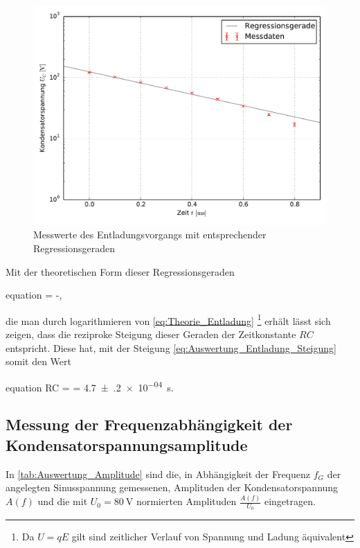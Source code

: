 	\begin{figure}[!h]
		\centering
		\includegraphics[scale=0.7]{Grafiken/Entladung.pdf}
		\caption{Messwerte des Entladungsvorgangs mit entsprechender Regressionsgeraden}
		\label{fig:Auswertung_EntladungLog}
	\end{figure}
	 
	Mit der theoretischen Form dieser Regressionsgeraden 
	\begin{empheq}{equation}
		\ln{}  = -, 
	\end{empheq}
	die man durch logarithmieren von \cref{eq:Theorie_Entladung}
	\footnote{Da $ U = qE $ gilt sind zeitlicher Verlauf von Spannung und Ladung äquivalent} erhält
	lässt sich zeigen, dass die reziproke Steigung dieser Geraden der Zeitkonstante $ RC $  entspricht.
	Diese hat, mit der Steigung \cref{eq:Auswertung_Entladung_Steigung} somit den Wert
	\begin{empheq}{equation}
		 RC =   = \SI{4.7(2)e-04}{\second}.
		 \footnotemark
		 \label{eq:Auswertung_RC1}
	\end{empheq}
	 
\newpage	 
\subsection{Messung der Frequenzabhängigkeit der \\ Kondensatorspannungsamplitude}
\label{sec:Auswertung_Amplitude}
	In \cref{tab:Auswertung_Amplitude} sind die, in Abhängigkeit der Frequenz $ f_{G} $ der angelegten 
	Sinusspannung gemessenen, Amplituden der Kondensatorspannung $A(f)$ und die mit $ U_{0} = \SI{80}{\volt} $
	normierten Amplituden $ \tfrac{A(f)}{U_{0}} $ eingetragen. 
	
